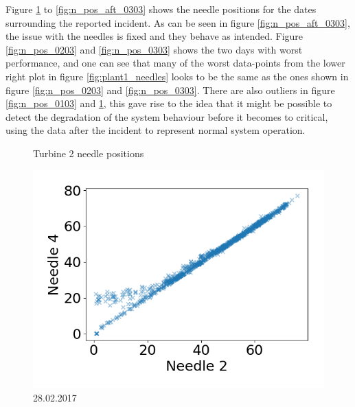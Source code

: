         Figure \ref{fig:n_pos_2802} to \ref{fig:n_pos_aft_0303} shows the needle positions for the dates surrounding the reported incident. As can be seen in figure \ref{fig:n_pos_aft_0303}, the issue with the needles is fixed and they behave as intended. Figure \ref{fig:n_pos_0203} and \ref{fig:n_pos_0303} shows the two days with worst performance, and one can see that many of the worst data-points from the lower right plot in figure \ref{fig:plant1_needles} looks to be the same as the ones shown in figure \ref{fig:n_pos_0203} and \ref{fig:n_pos_0303}. There are also outliers in figure \ref{fig:n_pos_0103} and \ref{fig:n_pos_2802}, this gave rise to the idea that it might be possible to detect the degradation of the system behaviour before it becomes to critical, using the data after the incident to represent normal system operation.
        \begin{figure}[h]
            \caption*{Turbine 2 needle positions}
            \begin{minipage}[b]{0.5\linewidth}
                \centering
                \includegraphics[width = \textwidth]{report/figures/data/turb2_n2_n4_28022017.png}
                \caption{28.02.2017}
                \label{fig:n_pos_2802}
            \end{minipage}
            \begin{minipage}[b]{0.5\linewidth}
                \centering

\end{minipage}
\end{figure}
